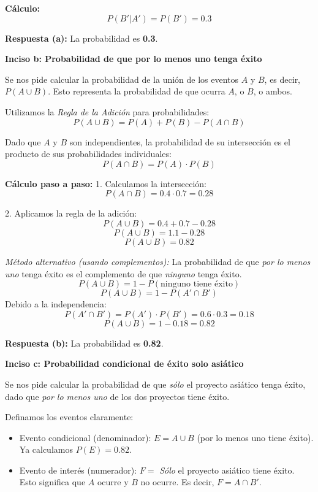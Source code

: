 \documentclass[a4paper]{article}
\begin{document}
\textbf{Cálculo:}
$$ P(B' | A') = P(B') = 0.3 $$

\textbf{Respuesta (a):} La probabilidad es \textbf{0.3}.

\vspace{0.3cm}

\textbf{Inciso b: Probabilidad de que por lo menos uno tenga éxito}

Se nos pide calcular la probabilidad de la unión de los eventos $A$ y $B$, es decir, $P(A \cup B)$. Esto representa la probabilidad de que ocurra $A$, o $B$, o ambos.

Utilizamos la \textit{Regla de la Adición} para probabilidades:
$$ P(A \cup B) = P(A) + P(B) - P(A \cap B) $$

Dado que $A$ y $B$ son independientes, la probabilidad de su intersección es el producto de sus probabilidades individuales:
$$ P(A \cap B) = P(A) \cdot P(B) $$

\textbf{Cálculo paso a paso:}
1. Calculamos la intersección:
$$ P(A \cap B) = 0.4 \cdot 0.7 = 0.28 $$

2. Aplicamos la regla de la adición:
$$ P(A \cup B) = 0.4 + 0.7 - 0.28 $$
$$ P(A \cup B) = 1.1 - 0.28 $$
$$ P(A \cup B) = 0.82 $$

\textit{Método alternativo (usando complementos):}
La probabilidad de que \textit{por lo menos uno} tenga éxito es el complemento de que \textit{ninguno} tenga éxito.
$$ P(A \cup B) = 1 - P(\text{ninguno tiene éxito}) $$
$$ P(A \cup B) = 1 - P(A' \cap B') $$
Debido a la independencia:
$$ P(A' \cap B') = P(A') \cdot P(B') = 0.6 \cdot 0.3 = 0.18 $$
$$ P(A \cup B) = 1 - 0.18 = 0.82 $$

\textbf{Respuesta (b):} La probabilidad es \textbf{0.82}.

\vspace{0.3cm}

\textbf{Inciso c: Probabilidad condicional de éxito solo asiático}

Se nos pide calcular la probabilidad de que \textit{sólo} el proyecto asiático tenga éxito, dado que \textit{por lo menos uno} de los dos proyectos tiene éxito.

Definamos los eventos claramente:
\begin{itemize}
    \item Evento condicional (denominador): $E = A \cup B$ (por lo menos uno tiene éxito). Ya calculamos $P(E) = 0.82$.
    \item Evento de interés (numerador): $F =$ \textit{Sólo} el proyecto asiático tiene éxito. Esto significa que $A$ ocurre y $B$ no ocurre. Es decir, $F = A \cap B'$.
\end{itemize}
\end{document}

